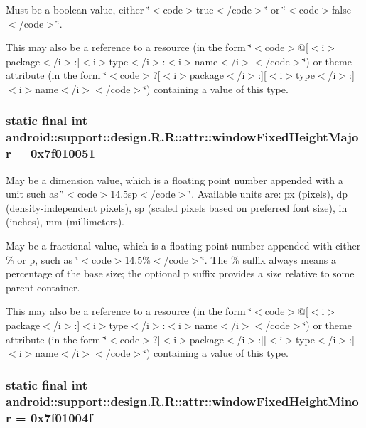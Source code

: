 Must be a boolean value, either \char`\"{}$<$code$>$true$<$/code$>$\char`\"{} or \char`\"{}$<$code$>$false$<$/code$>$\char`\"{}. 

This may also be a reference to a resource (in the form \char`\"{}$<$code$>$@\mbox{[}$<$i$>$package$<$/i$>$:\mbox{]}$<$i$>$type$<$/i$>$:$<$i$>$name$<$/i$>$$<$/code$>$\char`\"{}) or theme attribute (in the form \char`\"{}$<$code$>$?\mbox{[}$<$i$>$package$<$/i$>$:\mbox{]}\mbox{[}$<$i$>$type$<$/i$>$:\mbox{]}$<$i$>$name$<$/i$>$$<$/code$>$\char`\"{}) containing a value of this type. \hypertarget{classandroid_1_1support_1_1design_1_1_r_1_1attr_7d460d436cee93a5412a70711079a44a}{
\subsubsection[{windowFixedHeightMajor}]{\setlength{\rightskip}{0pt plus 5cm}static final int android::support::design.R.R::attr::windowFixedHeightMajor = 0x7f010051}}
\label{classandroid_1_1support_1_1design_1_1_r_1_1attr_7d460d436cee93a5412a70711079a44a}


May be a dimension value, which is a floating point number appended with a unit such as \char`\"{}$<$code$>$14.5sp$<$/code$>$\char`\"{}. Available units are: px (pixels), dp (density-independent pixels), sp (scaled pixels based on preferred font size), in (inches), mm (millimeters). 

May be a fractional value, which is a floating point number appended with either \% or p, such as \char`\"{}$<$code$>$14.5\%$<$/code$>$\char`\"{}. The \% suffix always means a percentage of the base size; the optional p suffix provides a size relative to some parent container. 

This may also be a reference to a resource (in the form \char`\"{}$<$code$>$@\mbox{[}$<$i$>$package$<$/i$>$:\mbox{]}$<$i$>$type$<$/i$>$:$<$i$>$name$<$/i$>$$<$/code$>$\char`\"{}) or theme attribute (in the form \char`\"{}$<$code$>$?\mbox{[}$<$i$>$package$<$/i$>$:\mbox{]}\mbox{[}$<$i$>$type$<$/i$>$:\mbox{]}$<$i$>$name$<$/i$>$$<$/code$>$\char`\"{}) containing a value of this type. \hypertarget{classandroid_1_1support_1_1design_1_1_r_1_1attr_6e4f087482ee854686d31c0094e1cab9}{
\subsubsection[{windowFixedHeightMinor}]{\setlength{\rightskip}{0pt plus 5cm}static final int android::support::design.R.R::attr::windowFixedHeightMinor = 0x7f01004f}}
\label{classandroid_1_1support_1_1design_1_1_r_1_1attr_6e4f087482ee854686d31c0094e1cab9}


